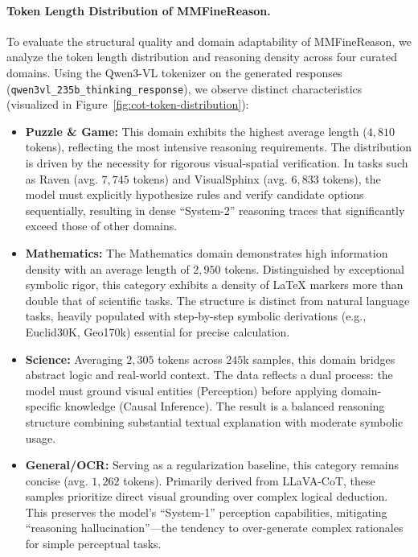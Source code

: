 \paragraph{Token Length Distribution of MMFineReason.}
To evaluate the structural quality and domain adaptability of MMFineReason, we analyze the token length distribution and reasoning density across four curated domains. Using the Qwen3-VL tokenizer on the generated responses (\texttt{qwen3vl\_235b\_thinking\_response}), we observe distinct characteristics (visualized in Figure~\ref{fig:cot-token-distribution}):
\begin{itemize}
\item \textbf{Puzzle \& Game:} This domain exhibits the highest average length ($4,810$ tokens), reflecting the most intensive reasoning requirements. The distribution is driven by the necessity for rigorous visual-spatial verification. In tasks such as Raven (avg. $7,745$ tokens) and VisualSphinx (avg. $6,833$ tokens), the model must explicitly hypothesize rules and verify candidate options sequentially, resulting in dense ``System-2'' reasoning traces that significantly exceed those of other domains.

\item \textbf{Mathematics:} The Mathematics domain demonstrates high information density with an average length of $2,950$ tokens. Distinguished by exceptional symbolic rigor, this category exhibits a density of LaTeX markers more than double that of scientific tasks. The structure is distinct from natural language tasks, heavily populated with step-by-step symbolic derivations (e.g., Euclid30K, Geo170k) essential for precise calculation.

\item \textbf{Science:} Averaging $2,305$ tokens across $245$k samples, this domain bridges abstract logic and real-world context. The data reflects a dual process: the model must ground visual entities (Perception) before applying domain-specific knowledge (Causal Inference). The result is a balanced reasoning structure combining substantial textual explanation with moderate symbolic usage.

\item \textbf{General/OCR:} Serving as a regularization baseline, this category remains concise (avg. $1,262$ tokens). Primarily derived from LLaVA-CoT, these samples prioritize direct visual grounding over complex logical deduction. This preserves the model's ``System-1'' perception capabilities, mitigating ``reasoning hallucination''—the tendency to over-generate complex rationales for simple perceptual tasks.
\end{itemize}





